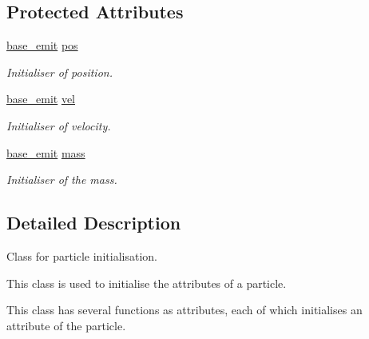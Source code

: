 \subsection*{Protected Attributes}
\begin{DoxyCompactItemize}
\item 
\mbox{\label{classphysim_1_1emitters_1_1base__emitter_ac67584a2ca34232c1f4f04c41599df0e}} 
\hyperlink{namespacephysim_1_1emitters_affb35fbd5f02c488436287899e35d4aa}{base\+\_\+emit} \hyperlink{classphysim_1_1emitters_1_1base__emitter_ac67584a2ca34232c1f4f04c41599df0e}{pos}
\begin{DoxyCompactList}\small\item\em Initialiser of position. \end{DoxyCompactList}\item 
\mbox{\label{classphysim_1_1emitters_1_1base__emitter_a9ea19d96450cff65882371b61a2294c8}} 
\hyperlink{namespacephysim_1_1emitters_affb35fbd5f02c488436287899e35d4aa}{base\+\_\+emit} \hyperlink{classphysim_1_1emitters_1_1base__emitter_a9ea19d96450cff65882371b61a2294c8}{vel}
\begin{DoxyCompactList}\small\item\em Initialiser of velocity. \end{DoxyCompactList}\item 
\mbox{\label{classphysim_1_1emitters_1_1base__emitter_a4e1b65730afef86899544d3306f7547d}} 
\hyperlink{namespacephysim_1_1emitters_affb35fbd5f02c488436287899e35d4aa}{base\+\_\+emit} \hyperlink{classphysim_1_1emitters_1_1base__emitter_a4e1b65730afef86899544d3306f7547d}{mass}
\begin{DoxyCompactList}\small\item\em Initialiser of the mass. \end{DoxyCompactList}\end{DoxyCompactItemize}


\subsection{Detailed Description}
Class for particle initialisation. 

This class is used to initialise the attributes of a particle.

This class has several functions as attributes, each of which initialises an attribute of the particle.

